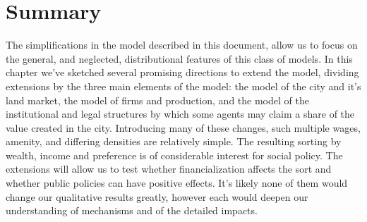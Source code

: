 




\section{Summary}


The simplifications in the model described in this document, 
allow us to focus on the general, and neglected, distributional features of this class of models. In this chapter we've sketched several promising directions to extend the model, 
dividing extensions by the three main elements of the model: the model of the city and it's land market, the model of firms and production, and the model of the institutional and legal structures by which some agents may claim a share of the value created in the city. %
Introducing many of these changes, such multiple wages, amenity, and differing densities are relatively simple. The resulting sorting by wealth, income and preference is of considerable interest for social policy. The extensions will allow us to test whether financialization affects the sort and whether public policies can have positive effects. It's likely none of them would change our qualitative results greatly, however each would deepen our understanding of mechanisms and of the detailed impacts. 

